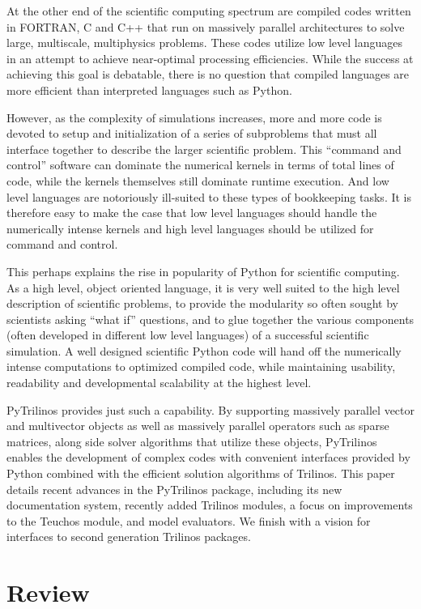 \documentclass[11pt]{article}
\begin{document}
At the other end of the scientific computing spectrum are compiled codes written in FORTRAN, C and C++ that run on massively parallel architectures to solve large, multiscale, multiphysics problems.  These codes utilize low level languages in an attempt to achieve near-optimal processing efficiencies.  While the success at achieving this goal is debatable, there is no question that compiled languages are more efficient than interpreted languages such as Python.

However, as the complexity of simulations increases, more and more code is devoted to setup and initialization of a series of subproblems that must all interface together to describe the larger scientific problem.  This ``command and control'' software can dominate the numerical kernels in terms of total lines of code, while the kernels themselves still dominate runtime execution.  And low level languages are notoriously ill-suited to these types of bookkeeping tasks.  It is therefore easy to make the case that low level languages should handle the numerically intense kernels and high level languages should be utilized for command and control.

This perhaps explains the rise in popularity of Python for scientific computing.  As a high level, object oriented language, it is very well suited to the high level description of scientific problems, to provide the modularity so often sought by scientists asking ``what if'' questions, and to glue together the various components (often developed in different low level languages) of a successful scientific simulation.  A well designed scientific Python code will hand off the numerically intense computations to optimized compiled code, while maintaining usability, readability and developmental scalability at the highest level.

PyTrilinos provides just such a capability.  By supporting massively parallel vector and multivector objects as well as massively parallel operators such as sparse matrices, along side solver algorithms that utilize these objects, PyTrilinos enables the development of complex codes with  convenient interfaces provided by Python combined with the efficient solution algorithms of Trilinos.  This paper details recent advances in the PyTrilinos package, including its new documentation system, recently added Trilinos modules, a focus on improvements to the Teuchos module, and model evaluators.  We finish with a vision for interfaces to second generation Trilinos packages.

\section{Review}
\label{sec:review}
\end{document}
